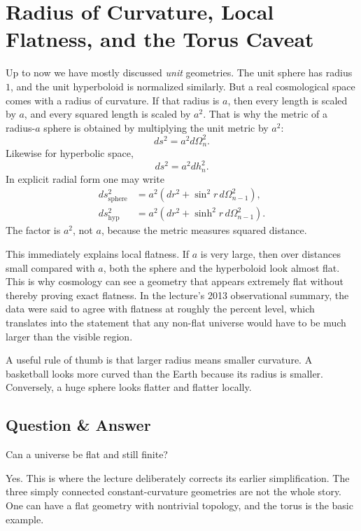 \section{Radius of Curvature, Local Flatness, and the Torus Caveat}

Up to now we have mostly discussed \emph{unit} geometries. The unit sphere has radius \(1\), and the unit hyperboloid is normalized similarly. But a real cosmological space comes with a radius of curvature. If that radius is \(a\), then every length is scaled by \(a\), and every squared length is scaled by \(a^2\). That is why the metric of a radius-\(a\) sphere is obtained by multiplying the unit metric by \(a^2\):
\begin{equation}
ds^2 = a^2 d\Omega_n^2.
\end{equation}
Likewise for hyperbolic space,
\begin{equation}
ds^2 = a^2 dh_n^2.
\end{equation}
In explicit radial form one may write
\begin{align}
ds_{\mathrm{sphere}}^2 &= a^2\left(dr^2 + \sin^2 r\, d\Omega_{n-1}^2\right),\\
ds_{\mathrm{hyp}}^2 &= a^2\left(dr^2 + \sinh^2 r\, d\Omega_{n-1}^2\right).
\end{align}
The factor is \(a^2\), not \(a\), because the metric measures squared distance.

This immediately explains local flatness. If \(a\) is very large, then over distances small compared with \(a\), both the sphere and the hyperboloid look almost flat. This is why cosmology can see a geometry that appears extremely flat without thereby proving exact flatness. In the lecture's 2013 observational summary, the data were said to agree with flatness at roughly the percent level, which translates into the statement that any non-flat universe would have to be much larger than the visible region.

A useful rule of thumb is that larger radius means smaller curvature. A basketball looks more curved than the Earth because its radius is smaller. Conversely, a huge sphere looks flatter and flatter locally.

\subsection{Question \& Answer}

Can a universe be flat and still finite?

Yes. This is where the lecture deliberately corrects its earlier simplification. The three simply connected constant-curvature geometries are not the whole story. One can have a flat geometry with nontrivial topology, and the torus is the basic example.


